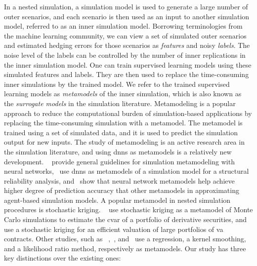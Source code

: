 In a nested simulation, a simulation model is used to generate a large number of outer scenarios, and each scenario is then used as an input to another simulation model, referred to as an inner simulation model.
Borrowing terminologies from the machine learning community, we can view a set of simulated outer scenarios and estimated hedging errors for those scenarios as \textit{features} and noisy \textit{labels}.
The noise level of the labels can be controlled by the number of inner replications in the inner simulation model.
One can train supervised learning models using these simulated features and labels.
They are then used to replace the time-consuming inner simulations by the trained model.
We refer to the trained supervised learning models as \textit{metamodels} of the inner simulation, which is also known as the \textit{surrogate models} in the simulation literature.
Metamodeling is a popular approach to reduce the computational burden of simulation-based applications by replacing the time-consuming simulation with a metamodel.
The metamodel is trained using a set of simulated data, and it is used to predict the simulation output for new inputs.
The study of metamodeling is an active research area in the simulation literature, and using \gls{dnn}s as metamodels is a relatively new development.
~\cite{fonseca2003simulation} provide general guidelines for simulation metamodeling with neural networks,~\cite{lieu2022adaptive} use \gls{dnn}s as metamodels of a simulation model for a structural reliability analysis, and~\cite{salle2014efficient} show that neural network metamodels help achieve higher degree of prediction accuracy that other metamodels in approximating agent-based simulation models.
A popular metamodel in nested simulation procedures is stochastic kriging.
~\cite{liu2010stochastic} use stochastic kriging as a metamodel of Monte Carlo simulations to estimate the \gls{cvar} of a portfolio of derivative securities, and~\cite{gan2015valuation} use a stochastic kriging for an efficient valuation of large portfolios of \gls{va} contracts.
Other studies, such as ~\cite{broadie2015risk},~\cite{hong2017kernel}, and~\cite{zhang2022sample} use a regression, a kernel smoothing, and a likelihood ratio method, respectively as metamodels.
Our study has three key distinctions over the existing ones:

